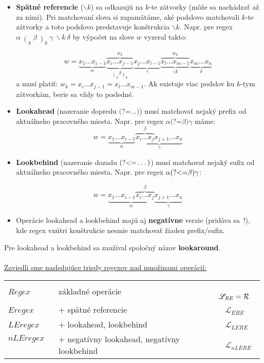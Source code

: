 \documentclass[myposter,portrait,plainboxedsections]{sciposter}
\def\R{{\cal R}} %
\def\re{Regex}
\def\e{Eregex}
\def\le{LEregex}
\def\nle{nLEregex}
\def\rel{{\mathscr{L}_{RE}}}
\def\el{\mathscr{L}_{ERE}}
\def\lel{\mathscr{L}_{LERE}}
\def\nlel{\mathscr{L}_{nLERE}}
\def\lookahead{\text{(?=}}
\def\lookbehind{\text{(?\textless =}}
\begin{document}
\begin{multicols*}{3}
\begin{itemize}

\item \textbf{Spätné referencie} ($\backslash k$) sa odkazujú na $k$-te zátvorky (môže sa nachádzať až za nimi). Pri matchovaní slova si zapamätáme, aké podslovo matchovali $k$-te zátvorky a toto podslovo predstavuje konštrukcia $\backslash k$. Napr. pre regex
 $\displaystyle \alpha~ \mathop(_k ~\beta ~\mathop)_k ~\gamma ~\backslash k ~\delta$ by výpočet na slove $w$ vyzeral takto:

$$w = \underbrace{x_1\dots x_{i-1}}_\alpha 
 \overbrace{\underbrace{x_i\dots x_{j-1}}_{ \displaystyle{\mathop(_k\beta \mathop)_k}}}^{w_k} 
 \underbrace{x_j\dots x_{l-1}}_\gamma 
 \overbrace{\underbrace{x_l\dots x_{m-1}}_{\backslash k}}^{w_k}
 \underbrace{x_{m}\dots x_{n}}_\delta$$
a musí platiť: $w_k= x_i\dots x_{j-1} = x_l\dots x_{m-1} $. Ak existuje viac podslov ku $k$-tym zátvorkám, berie sa vždy to posledné.

\item \textbf{Lookahead} (nazeranie dopredu $\lookahead\dots)$) musí matchovať nejaký prefix od aktuálneho pracovného miesta. Napr. pre regex $\alpha\lookahead\beta)\gamma$ máme:
 $$w = \underbrace{x_1\dots x_{i-1}}_\alpha \underbrace{\overbrace{x_i \dots x_j}^\beta x_{j+1} \dots x_n }_\gamma$$ 

\item \textbf{Lookbehind} (nazeranie dozadu $\lookbehind\dots)$) musí matchovať nejaký sufix od aktuálneho pracovného miesta. Napr. pre regex $\alpha\lookbehind\beta)\gamma$:

$$w = \underbrace{x_1\dots x_{i-1} \overbrace{x_i \dots x_j}^\beta}_\alpha \underbrace{x_{j+1} \dots x_n }_\gamma$$

\item Operácie lookahead a lookbehind majú aj \textbf{negatívne} verzie (pridáva sa~!), kde regex vnútri konštrukcie nesmie matchovať žiaden prefix/sufix.

\end{itemize}
Pre lookahead a lookbehind sa zaužíval spoločný názov \textbf{lookaround}.
\\ \\
\underline{Zaviedli sme nasledujúce triedy regexov nad množinami operácií:}

\begin{tabular}{lll}
$\re$ ~& základné operácie &~ $\rel = \R$ \\
$\e$ ~& + spätné referencie &~ $\el$ \\
$\le$ ~& + lookahead, lookbehind &~ $\lel$ \\
$\nle$ ~& + negatívny lookahead, negatívny lookbehind &~ $\nlel$
\end{tabular}


\end{multicols*}
\end{document}
